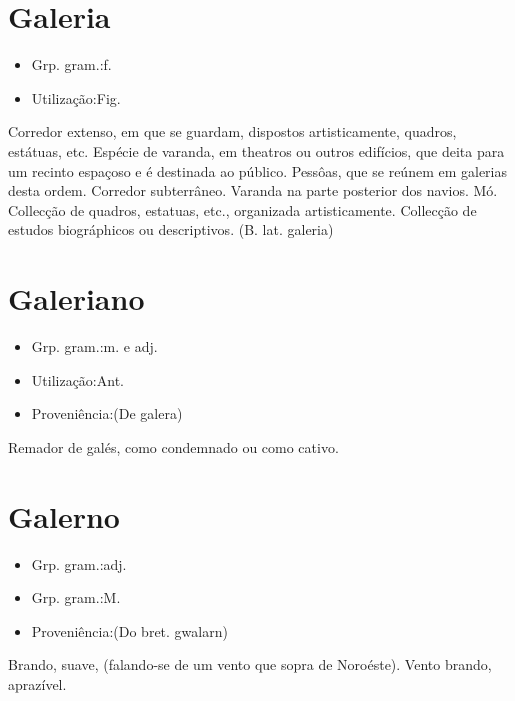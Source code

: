 \section{Galeria}
\begin{itemize}
\item {Grp. gram.:f.}
\end{itemize}
\begin{itemize}
\item {Utilização:Fig.}
\end{itemize}
Corredor extenso, em que se guardam, dispostos artisticamente, quadros, estátuas, etc.
Espécie de varanda, em theatros ou outros edifícios, que deita para um recinto espaçoso e é destinada ao público.
Pessôas, que se reúnem em galerias desta ordem.
Corredor subterrâneo.
Varanda na parte posterior dos navios.
Mó.
Collecção de quadros, estatuas, etc., organizada artisticamente.
Collecção de estudos biográphicos ou descriptivos.
(B. lat. \textunderscore galeria\textunderscore )
\section{Galeriano}
\begin{itemize}
\item {Grp. gram.:m.  e  adj.}
\end{itemize}
\begin{itemize}
\item {Utilização:Ant.}
\end{itemize}
\begin{itemize}
\item {Proveniência:(De \textunderscore galera\textunderscore )}
\end{itemize}
Remador de galés, como condemnado ou como cativo.
\section{Galerno}
\begin{itemize}
\item {Grp. gram.:adj.}
\end{itemize}
\begin{itemize}
\item {Grp. gram.:M.}
\end{itemize}
\begin{itemize}
\item {Proveniência:(Do bret. \textunderscore gwalarn\textunderscore )}
\end{itemize}
Brando, suave, (falando-se de um vento que sopra de Noroéste).
Vento brando, aprazível.
